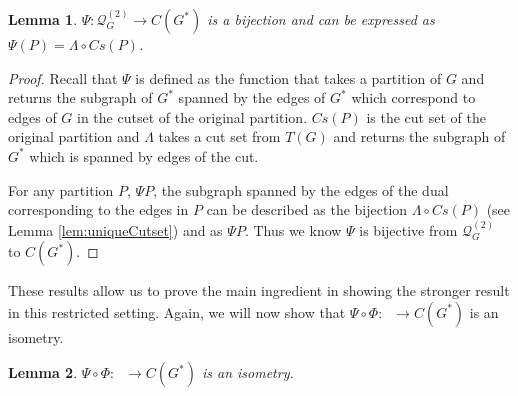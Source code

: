 \documentclass{article}
\newtheorem{lemma}{Lemma}[section]
\DeclareMathOperator{\At}{\mathcal{A}_{G}^{(2)}}
\begin{document}
    \begin{lemma}\label{lem:psiBijective}
        $\Psi:\mathcal{Q}_{G}^{(2)}\to C(G^*)$ is a bijection and can be expressed as $\Psi (P)=\Lambda \circ Cs(P)$. 
    \end{lemma}

    \begin{proof}
        Recall that $\Psi$ is defined as the function that takes a partition of $G$ and returns the subgraph of $G^*$ spanned by the edges of $G^*$ which correspond to edges of $G$ in the cutset of the original partition. $Cs(P)$ is the cut set of the original partition and $\Lambda$ takes a cut set from $T(G)$ and returns the subgraph of $G^*$ which is spanned by edges of the cut. 

        For any partition $P$, $\Psi P$, the subgraph spanned by the edges of the dual corresponding to the edges in $P$ can be described as the bijection $\Lambda \circ Cs(P)$ (see Lemma \ref {lem:uniqueCutset}) and as $\Psi P$. Thus we know $\Psi$ is bijective from $\mathcal{Q}_G^{(2)}$ to $C(G^*)$.
    \end{proof}

    These results allow us to prove the main ingredient in showing the stronger result in this restricted setting. Again, we will now show that $\Psi\circ\Phi:\At\to C(G^*)$ is an isometry.

    \begin{lemma}\label{lem:twoStratIsometry}
         $\Psi\circ\Phi:\At\to C(G^*)$ is an isometry. 
    \end{lemma}
\end{document}
